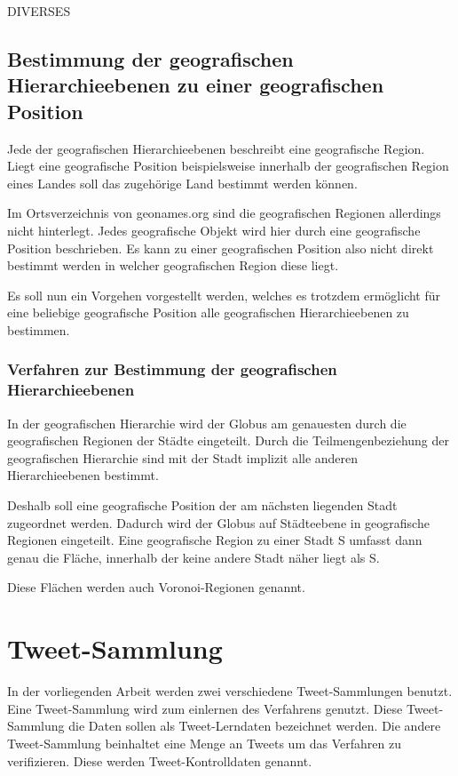 DIVERSES


\subsection{Bestimmung der geografischen Hierarchieebenen zu einer geografischen Position} 
			
			Jede der geografischen Hierarchieebenen beschreibt eine geografische Region.
			Liegt eine geografische Position beispielsweise innerhalb der geografischen Region eines Landes soll das zugehörige Land bestimmt werden können.

			Im Ortsverzeichnis von geonames.org sind die geografischen Regionen allerdings nicht hinterlegt.
			Jedes geografische Objekt wird hier durch eine geografische Position beschrieben.
			Es kann zu einer geografischen Position also nicht direkt bestimmt werden in welcher geografischen Region diese liegt.

			Es soll nun ein Vorgehen vorgestellt werden, welches es trotzdem ermöglicht für eine beliebige geografische Position alle geografischen Hierarchieebenen zu bestimmen.
			
			\subsubsection{Verfahren zur Bestimmung der geografischen Hierarchieebenen}

				In der geografischen Hierarchie wird der Globus am genauesten durch die geografischen Regionen der Städte eingeteilt.
				Durch die Teilmengenbeziehung der geografischen Hierarchie sind mit der Stadt implizit alle anderen Hierarchieebenen bestimmt.

				Deshalb soll eine geografische Position der am nächsten liegenden Stadt zugeordnet werden.
				Dadurch wird der Globus auf Städteebene in geografische Regionen eingeteilt. 
				Eine geografische Region zu einer Stadt S umfasst dann genau die Fläche, innerhalb der keine andere Stadt näher liegt als S.

				Diese Flächen werden auch Voronoi-Regionen genannt.

			



\section{Tweet-Sammlung} 
		
		In der vorliegenden Arbeit werden zwei verschiedene Tweet-Sammlungen benutzt.
		Eine Tweet-Sammlung wird zum einlernen des Verfahrens genutzt.
		Diese Tweet-Sammlung die Daten sollen als Tweet-Lerndaten bezeichnet werden.
		Die andere Tweet-Sammlung beinhaltet eine Menge an Tweets um das Verfahren zu verifizieren.
		Diese werden Tweet-Kontrolldaten genannt.

